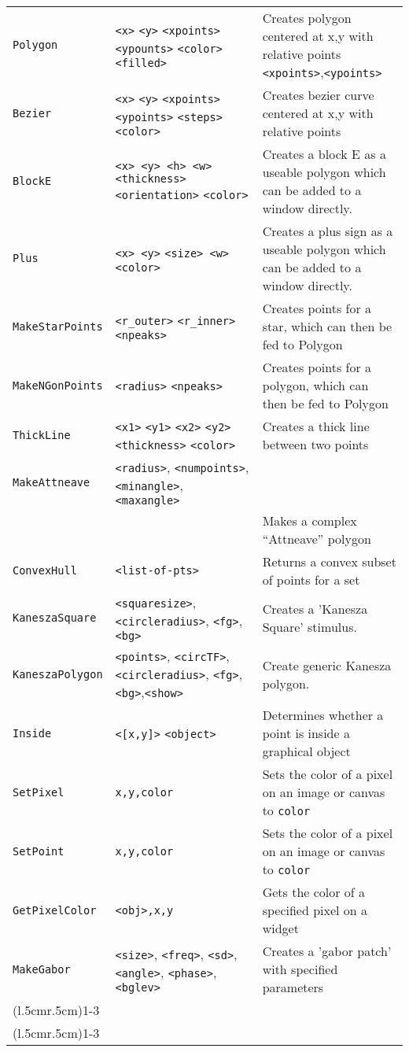 \begin{longtable}{p{3cm}p{3cm}p{6cm}}
\verb+Polygon+ &\verb+<x>+ \verb+<y>+ \verb+<xpoints>+ \verb+<ypounts>+  \verb+<color>+\verb+<filled>+ &Creates polygon centered at x,y with relative points \verb+<xpoints>+,\verb+<ypoints>+\\ 
\verb+Bezier+ &\verb+<x>+ \verb+<y>+ \verb+<xpoints>+ \verb+<ypoints>+ \verb+<steps>+ \verb+<color>+ &Creates bezier curve centered at x,y with relative points \\ 
\verb+BlockE+         &\verb+<x> <y> <h> <w>+ \verb+<thickness>+ \verb+<orientation>+ \verb+<color>+ &Creates a block E as a useable polygon which can be added to a window directly.\\ 
\verb+Plus+           &\verb+<x> <y>+ \verb+<size> <w>+ \verb+<color>+
&Creates a plus sign as a useable polygon which can be added to a window directly.\\ 
\verb+MakeStarPoints+ &\verb+<r_outer>+ \verb+<r_inner>+ \verb+<npeaks>+ &Creates points for a star, which can then be fed to Polygon\\ 
\verb+MakeNGonPoints+ &\verb+<radius>+ \verb+<npeaks>+ &Creates points for a polygon, which can then be fed to Polygon\\ 
\verb+ThickLine+ &\verb+<x1>+ \verb+<y1>+ \verb+<x2>+ \verb+<y2>+ \verb+<thickness>+ \verb+<color>+ &Creates a thick line between two points\\ 
\verb+MakeAttneave+&\verb+<radius>+, \verb+<numpoints>+, \verb+<minangle>+, \verb+<maxangle>+\\
& &Makes a complex ``Attneave'' polygon\\
\verb+ConvexHull+&\verb+<list-of-pts>+& Returns a convex subset of
points for a set\\
\verb+KaneszaSquare+& \verb+<squaresize>+, \verb+<circleradius>+, \verb+<fg>+, \verb+<bg>+ & Creates a 'Kanesza Square' stimulus.\\
\verb+KaneszaPolygon+&\verb+<points>+, \verb+<circTF>+, \verb+<circleradius>+, \verb+<fg>+, \verb+<bg>+,\verb+<show>+& Create generic Kanesza polygon.\\
 

\verb+Inside+  & \verb+<[x,y]>+ \verb+<object>+ & Determines whether a point is inside a graphical object\\ 
\verb+SetPixel+&\verb+x,y,color+&Sets the color of a pixel on an image or canvas to \verb+color+\\
\verb+SetPoint+&\verb+x,y,color+&Sets the color of a pixel on an image or canvas to \verb+color+\\
\verb+GetPixelColor+&\verb+<obj>,x,y+&Gets the color of a specified pixel on a widget\\
\verb+MakeGabor+&\verb+<size>+, \verb+<freq>+, \verb+<sd>+, \verb+<angle>+, \verb+<phase>+, \verb+<bglev>+
      &Creates a 'gabor patch' with specified parameters\\
\addlinespace[0.2cm] 
\cmidrule(l{.5cm}r{.5cm}){1-3} 
\multicolumn{3}{c}{\textbf{Sound Objects Functions}}\\ 
\cmidrule(l{.5cm}r{.5cm}){1-3} 


\end{longtable}
